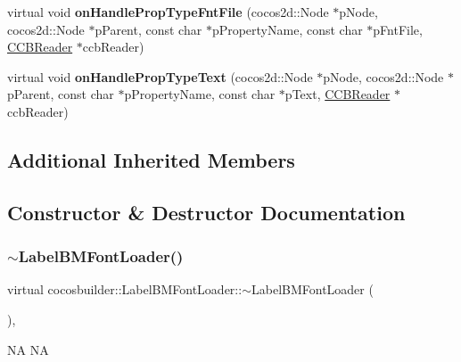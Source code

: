 \begin{DoxyCompactItemize}
virtual void {\bfseries on\+Handle\+Prop\+Type\+Fnt\+File} (cocos2d\+::\+Node $\ast$p\+Node, cocos2d\+::\+Node $\ast$p\+Parent, const char $\ast$p\+Property\+Name, const char $\ast$p\+Fnt\+File, \hyperlink{classcocosbuilder_1_1CCBReader}{C\+C\+B\+Reader} $\ast$ccb\+Reader)
\item 
\mbox{\label{classcocosbuilder_1_1LabelBMFontLoader_a65e906ec5cf62c991ea2dffeebb1b3d1}} 
virtual void {\bfseries on\+Handle\+Prop\+Type\+Text} (cocos2d\+::\+Node $\ast$p\+Node, cocos2d\+::\+Node $\ast$p\+Parent, const char $\ast$p\+Property\+Name, const char $\ast$p\+Text, \hyperlink{classcocosbuilder_1_1CCBReader}{C\+C\+B\+Reader} $\ast$ccb\+Reader)
\end{DoxyCompactItemize}
\subsection*{Additional Inherited Members}


\subsection{Constructor \& Destructor Documentation}
\mbox{\label{classcocosbuilder_1_1LabelBMFontLoader_a59fe695d66bffcd8434e0c6b2051bb48}} 
\subsubsection{\texorpdfstring{$\sim$\+Label\+B\+M\+Font\+Loader()}{~LabelBMFontLoader()}\hspace{0.1cm}{\footnotesize\ttfamily [1/2]}}
{\footnotesize\ttfamily virtual cocosbuilder\+::\+Label\+B\+M\+Font\+Loader\+::$\sim$\+Label\+B\+M\+Font\+Loader (\begin{DoxyParamCaption}{ }\end{DoxyParamCaption})\hspace{0.3cm}{\ttfamily [inline]}, {\ttfamily [virtual]}}

NA  NA \mbox{\label{classcocosbuilder_1_1LabelBMFontLoader_a59fe695d66bffcd8434e0c6b2051bb48}} 

